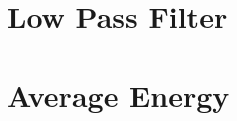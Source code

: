\documentclass[a4paper]{report}
\newcommand{\onlyinsubfile}[1]{#1}
\newcommand{\notinsubfile}[1]{}
\begin{document}
        \renewcommand{\onlyinsubfile}[1]{}
        \renewcommand{\notinsubfile}[1]{#1}
        

        \section{Low Pass Filter}
        

        \section{Average Energy}
        
\end{document}
